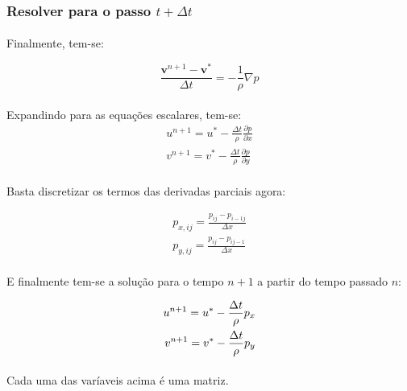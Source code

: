 \documentclass[poisson.tex]{subfiles}
\begin{document}
\subsubsection{Resolver para o passo $t+\Delta t$}
\paragraph{} Finalmente, tem-se: 

\begin{equation}
\frac{\textbf{v}^{n+1}-\textbf{v}^*}{\Delta t}=-\frac{1}{\rho}\nabla p
\end{equation}
\paragraph{} Expandindo para as equações escalares, tem-se:
\begin{eqnarray}
u^{n+1}=u^*-\frac{\Delta t}{\rho}\frac{\partial p}{\partial x}\\
v^{n+1}=v^*-\frac{\Delta t}{\rho}\frac{\partial p}{\partial y}
\end{eqnarray}
\paragraph{} Basta discretizar os termos das derivadas parciais agora:

\begin{eqnarray}
p_{x,ij}=\frac{p_{ij}-p_{i-1j}}{\Delta x}\\
p_{y,ij}=\frac{p_{ij}-p_{ij-1}}{\Delta x}
\end{eqnarray}

\paragraph{} E finalmente tem-se a solução para o tempo $n+1$ a partir do tempo passado $n$:

\begin{eqnarray}
{u}^{n+1}={u}^*-\frac{\Delta t}{\rho}p_{x}\\
{v}^{n+1}={v}^*-\frac{\Delta t}{\rho}p_{y}
\end{eqnarray}
\paragraph{} Cada uma das varíaveis acima é uma matriz.
\end{document}
